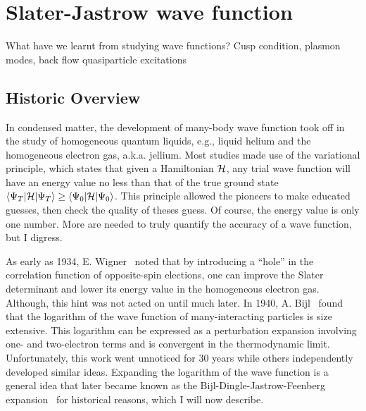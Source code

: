 \chapter{Slater-Jastrow wave function}

What have we learnt from studying wave functions?
Cusp condition, plasmon modes, back flow quasiparticle excitations

\section{Historic Overview}

In condensed matter, the development of many-body wave function took off in the study of homogeneous quantum liquids, e.g., liquid helium and the homogeneous electron gas, a.k.a. jellium. Most studies made use of the variational principle, which states that given a Hamiltonian $\mathcal{H}$, any trial wave function will have an energy value no less than that of the true ground state $\braket{\Psi_T|\mathcal{H}|\Psi_T}\ge\braket{\Psi_0|\mathcal{H}|\Psi_0}$. This principle allowed the pioneers to make educated guesses, then check the quality of theses guess. Of course, the energy value is only one number. More are needed to truly quantify the accuracy of a wave function, but I digress.

As early as 1934, E. Wigner~\cite{Wigner1934} noted that by introducing a “hole” in the correlation function of opposite-spin elections, one can improve the Slater determinant and lower its energy value in the homogeneous electron gas. Although, this hint was not acted on until much later.
In 1940, A. Bijl~\cite{Bijl1940} found that the logarithm of the wave function of many-interacting particles is size extensive. This logarithm can be expressed as a perturbation expansion involving one- and two-electron terms and is convergent in the thermodynamic limit.
Unfortunately, this work went unnoticed for 30 years while others independently developed similar ideas. Expanding the logarithm of the wave function is a general idea that later became known as the Bijl-Dingle-Jastrow-Feenberg expansion~\cite{Carleo2017} for historical reasons, which I will now describe.

